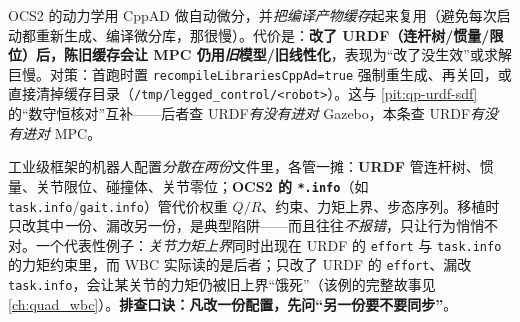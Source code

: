 \begin{pitfall}\label{pit:qp-cppad-cache}
OCS2 的动力学用 CppAD 做自动微分，并\emph{把编译产物缓存}起来复用（避免每次启动都重新生成、编译微分库，那很慢）。代价是：\textbf{改了 URDF（连杆树/惯量/限位）后，陈旧缓存会让 MPC 仍用\emph{旧}模型/旧线性化}，表现为“改了没生效”或求解巨慢\cite{sleiman2021unified}。对策：首跑时置 \texttt{recompileLibrariesCppAd=true} 强制重生成、再关回，或直接清掉缓存目录（\texttt{/\allowbreak tmp/\allowbreak legged\_control/\allowbreak <robot>}）。这与 \cref{pit:qp-urdf-sdf} 的“数守恒核对”互补——后者查 URDF\emph{有没有进对} Gazebo，本条查 URDF\emph{有没有进对} MPC。
\end{pitfall}

\begin{pitfall}\label{pit:qp-task-vs-urdf}
工业级框架的机器人配置\emph{分散在两份}文件里，各管一摊：\textbf{URDF} 管连杆树、惯量、关节限位、碰撞体、关节零位；\textbf{OCS2 的 \texttt{*.info}}（如 \texttt{task.info}/\allowbreak\texttt{gait.info}）管代价权重 $Q/R$、约束、力矩上界、步态序列。移植时只改其中\emph{一}份、漏改另一份，是典型陷阱——而且往往\emph{不报错}，只让行为悄悄不对。一个代表性例子：\emph{关节力矩上界}同时出现在 URDF 的 \texttt{effort} 与 \texttt{task.info} 的力矩约束里，而 WBC 实际读的是后者；只改了 URDF 的 \texttt{effort}、漏改 \texttt{task.info}，会让某关节的力矩仍被旧上界“饿死”（该例的完整故事见 \cref{ch:quad_wbc}）。\textbf{排查口诀：凡改一份配置，先问“另一份要不要同步”}。
\end{pitfall}

